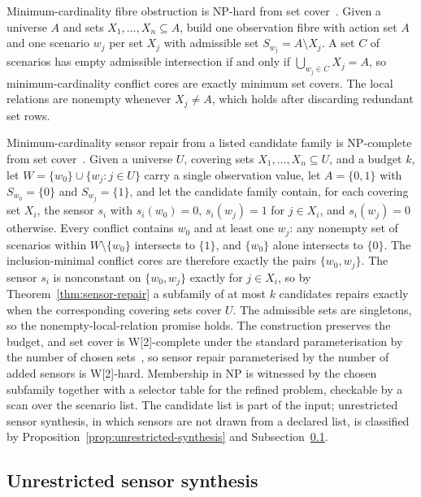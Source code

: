 \documentclass[11pt]{article}
\theoremstyle{plain}
\theoremstyle{definition}
\theoremstyle{remark}
\begin{document}
Minimum-cardinality fibre obstruction is NP-hard from set
cover~\cite{karp72}.  Given a universe \(A\) and sets \(X_1,\dots,X_n
\subseteq A\), build one observation fibre with action set \(A\) and one
scenario \(w_j\) per set \(X_j\) with admissible set \(S_{w_j}=A\setminus
X_j\).  A set \(C\) of scenarios has empty admissible intersection if and
only if \(\bigcup_{w_j\in C}X_j=A\), so minimum-cardinality conflict cores
are exactly minimum set covers.  The local relations are nonempty whenever
\(X_j\ne A\), which holds after discarding redundant set rows.

Minimum-cardinality sensor repair from a listed candidate family is
NP-complete from set cover~\cite{karp72}.  Given a universe \(U\), covering
sets \(X_1,\dots,X_n\subseteq U\), and a budget \(k\), let
\(W=\{w_0\}\cup\{w_j:j\in U\}\) carry a single observation value, let
\(A=\{0,1\}\) with \(S_{w_0}=\{0\}\) and \(S_{w_j}=\{1\}\), and let the
candidate family contain, for each covering set \(X_i\), the sensor \(s_i\)
with \(s_i(w_0)=0\), \(s_i(w_j)=1\) for \(j\in X_i\), and \(s_i(w_j)=0\)
otherwise.  Every conflict contains \(w_0\) and at least one \(w_j\): any
nonempty set of scenarios within \(W\setminus\{w_0\}\) intersects to
\(\{1\}\), and \(\{w_0\}\) alone intersects to \(\{0\}\).  The
inclusion-minimal conflict cores are therefore exactly the pairs
\(\{w_0,w_j\}\).  The sensor \(s_i\) is nonconstant on \(\{w_0,w_j\}\)
exactly for \(j\in X_i\), so by Theorem~\ref{thm:sensor-repair} a subfamily
of at most \(k\) candidates repairs exactly when the corresponding covering
sets cover \(U\).  The admissible sets are singletons, so the
nonempty-local-relation promise holds.  The construction preserves the
budget, and set cover is W[2]-complete under the standard parameterisation by
the number of chosen sets~\cite{downey-fellows99}, so sensor repair
parameterised by the number of added sensors is W[2]-hard.  Membership in NP
is witnessed by the chosen subfamily together with a selector table for the
refined problem, checkable by a scan over the scenario list.  The candidate
list is part of the input; unrestricted sensor synthesis, in which sensors
are not drawn from a declared list, is classified by
Proposition~\ref{prop:unrestricted-synthesis} and
Subsection~\ref{subsec:unrestricted-synthesis}.

\subsection{Unrestricted sensor synthesis}
\label{subsec:unrestricted-synthesis}
\end{document}
